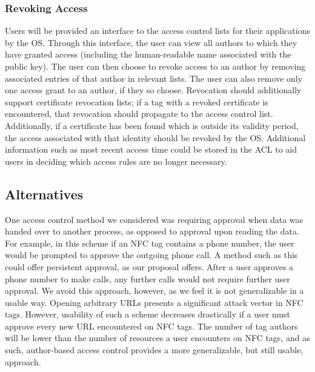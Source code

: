 \documentclass[12pt]{article}
\begin{document}
\subsubsection{Revoking Access}
Users will be provided an interface to the access control lists for their applications by the OS.
Through this interface, the user can view all authors to which they have granted access (including the human-readable name associated with the public key).
The user can then choose to revoke access to an author by removing associated entries of that author in relevant lists.
The user can also remove only one access grant to an author, if they so choose.
Revocation should additionally support certificate revocation lists; if a tag with a revoked certificate is encountered, that revocation should propagate to the access control list.
Additionally, if a certificate has been found which is outside its validity period, the access associated with that identity should be revoked by the OS.
Additional information such as most recent access time could be stored in the ACL to aid users in deciding which access rules are no longer necessary.


\subsection{Alternatives}
One access control method we considered was requiring approval when data was handed over to another process, as opposed to approval upon reading the data.
For example, in this scheme if an NFC tag contains a phone number, the user would be prompted to approve the outgoing phone call.
A method such as this could offer persistent approval, as our proposal offers.
After a user approves a phone number to make calls, any further calls would not require further user approval.
We avoid this approach, however, as we feel it is not generalizable in a usable way.
Opening arbitrary URLs presents a significant attack vector in NFC tags.
However, usability of such a scheme decreases drastically if a user must approve every new URL encountered on NFC tags.
The number of tag authors will be lower than the number of resources a user encounters on NFC tags, and as such, author-based access control provides a more generalizable, but still usable, approach.
\end{document}
